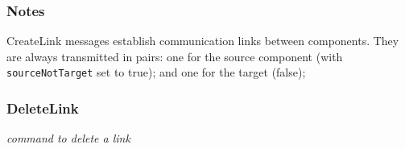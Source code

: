 \documentclass[pdftex,a4paper]{article}
\newcommand{\XMLfont}[1]{{\tt \small #1}}
\begin{document}
\subsubsection*{Notes}

CreateLink messages establish communication links between
components. They are always transmitted in pairs: one for the source
component (with \XMLfont{sourceNotTarget} set to true); and one for
the target (false);


\clearpage

\subsubsection{DeleteLink}

{\em command to delete a link}
\end{document}
